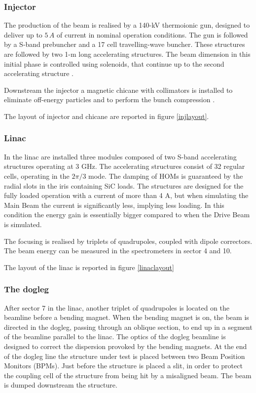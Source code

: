 \subsubsection{Injector}

The production of the beam is realised by a 140-kV thermoionic gun, designed to deliver up to $5\,A$ of current in nominal operation conditions.
The gun is followed by a S-band prebuncher and a 17 cell travelling-wave buncher. These structures are followed by two 1-m long accelerating structures. The beam dimension in this initial phase is controlled using solenoids, that continue up to the second accelerating structure \cite{ctf:injector}.

Downstream the injector a magnetic chicane with collimators is installed to eliminate off-energy particles and to perform the bunch compression  \cite{Braun:999488}.

The layout of injector and chicane are reported in figure \ref{injlayout}.

\subsubsection{Linac}

In the linac are installed three modules composed of two S-band accelerating structures operating at 3 GHz. The accelerating structures consist of 32 regular cells, operating in the $2\pi/3$ mode. The damping of HOMs is guaranteed by the radial slots in the iris containing SiC loads. The structures are designed for the fully loaded operation with a current of more than 4 A, but when simulating the Main Beam the current is significantly less, implying less loading. In this condition the energy gain is essentially bigger compared to when the Drive Beam is simulated.

The focusing is realised by triplets of quadrupoles, coupled with dipole correctors. The beam energy can be measured in the spectrometers in sector 4 and 10.

The layout of the linac is reported in figure \ref{linaclayout}

\subsubsection{The dogleg}

After sector 7 in the linac, another triplet of quadrupoles is located on the beamline before a bending magnet. When the bending magnet is on, the beam is directed in the dogleg, passing through an oblique section, to end up in a segment of the beamline parallel to the linac. The optics of the dogleg beamline is designed to correct the dispersion provoked by the bending magnets. At the end of the dogleg line the structure under test is placed between two Beam Position Monitors (BPMs). Just before the structure is placed a slit, in order to protect the coupling cell of the structure from being hit by a misaligned beam. The beam is dumped downstream the structure.


